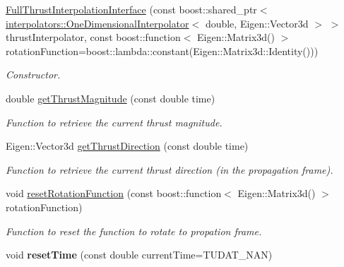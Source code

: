\begin{DoxyCompactItemize}
\item 
\hyperlink{classtudat_1_1simulation__setup_1_1FullThrustInterpolationInterface_ab2172c5a4be94598cc770b24934af9ba}{Full\+Thrust\+Interpolation\+Interface} (const boost\+::shared\+\_\+ptr$<$ \hyperlink{classtudat_1_1interpolators_1_1OneDimensionalInterpolator}{interpolators\+::\+One\+Dimensional\+Interpolator}$<$ double, Eigen\+::\+Vector3d $>$ $>$ thrust\+Interpolator, const boost\+::function$<$ Eigen\+::\+Matrix3d() $>$ rotation\+Function=boost\+::lambda\+::constant(Eigen\+::\+Matrix3d\+::\+Identity()))
\begin{DoxyCompactList}\small\item\em Constructor. \end{DoxyCompactList}\item 
double \hyperlink{classtudat_1_1simulation__setup_1_1FullThrustInterpolationInterface_a864be539796a1546e8a3dd7c5bfb62ee}{get\+Thrust\+Magnitude} (const double time)
\begin{DoxyCompactList}\small\item\em Function to retrieve the current thrust magnitude. \end{DoxyCompactList}\item 
Eigen\+::\+Vector3d \hyperlink{classtudat_1_1simulation__setup_1_1FullThrustInterpolationInterface_aa8525ab07094c5c9998f7c787f4043a4}{get\+Thrust\+Direction} (const double time)
\begin{DoxyCompactList}\small\item\em Function to retrieve the current thrust direction (in the propagation frame). \end{DoxyCompactList}\item 
void \hyperlink{classtudat_1_1simulation__setup_1_1FullThrustInterpolationInterface_a941ea04e49a48c16e19b619f0ce44718}{reset\+Rotation\+Function} (const boost\+::function$<$ Eigen\+::\+Matrix3d() $>$ rotation\+Function)
\begin{DoxyCompactList}\small\item\em Function to reset the function to rotate to propation frame. \end{DoxyCompactList}\item 
void {\bfseries reset\+Time} (const double current\+Time=T\+U\+D\+A\+T\+\_\+\+N\+AN)\hypertarget{classtudat_1_1simulation__setup_1_1FullThrustInterpolationInterface_a5faebff09753455845a5d783808940e5}{}\label{classtudat_1_1simulation__setup_1_1FullThrustInterpolationInterface_a5faebff09753455845a5d783808940e5}

\end{DoxyCompactItemize}


